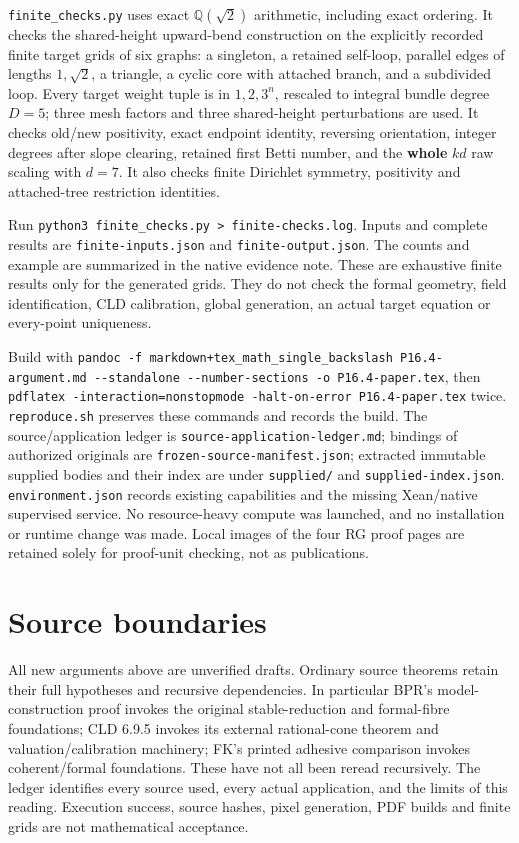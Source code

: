 \documentclass[
  11pt,
]{article}
\begin{document}
\texttt{finite\_checks.py} uses exact \(\mathbb Q(\sqrt2)\) arithmetic,
including exact ordering. It checks the shared-height upward-bend
construction on the explicitly recorded finite target grids of six
graphs: a singleton, a retained self-loop, parallel edges of lengths
\(1,\sqrt2\), a triangle, a cyclic core with attached branch, and a
subdivided loop. Every target weight tuple is in \({1,2,3}^n\), rescaled
to integral bundle degree \(D=5\); three mesh factors and three
shared-height perturbations are used. It checks old/new positivity,
exact endpoint identity, reversing orientation, integer degrees after
slope clearing, retained first Betti number, and the \textbf{whole}
\(kd\) raw scaling with \(d=7\). It also checks finite Dirichlet
symmetry, positivity and attached-tree restriction identities.

Run
\texttt{python3\ finite\_checks.py\ \textgreater{}\ finite-checks.log}.
Inputs and complete results are \texttt{finite-inputs.json} and
\texttt{finite-output.json}. The counts and example are summarized in
the native evidence note. These are exhaustive finite results only for
the generated grids. They do not check the formal geometry, field
identification, CLD calibration, global generation, an actual target
equation or every-point uniqueness.

Build with
\texttt{pandoc\ -f\ markdown+tex\_math\_single\_backslash\ P16.4-argument.md\ -\/-standalone\ -\/-number-sections\ -o\ P16.4-paper.tex},
then
\texttt{pdflatex\ -interaction=nonstopmode\ -halt-on-error\ P16.4-paper.tex}
twice. \texttt{reproduce.sh} preserves these commands and records the
build. The source/application ledger is
\texttt{source-application-ledger.md}; bindings of authorized originals
are \texttt{frozen-source-manifest.json}; extracted immutable supplied
bodies and their index are under \texttt{supplied/} and
\texttt{supplied-index.json}. \texttt{environment.json} records existing
capabilities and the missing Xean/native supervised service. No
resource-heavy compute was launched, and no installation or runtime
change was made. Local images of the four RG proof pages are retained
solely for proof-unit checking, not as publications.

\section{Source boundaries}\label{source-boundaries}

All new arguments above are unverified drafts. Ordinary source theorems
retain their full hypotheses and recursive dependencies. In particular
BPR's model-construction proof invokes the original stable-reduction and
formal-fibre foundations; CLD 6.9.5 invokes its external rational-cone
theorem and valuation/calibration machinery; FK's printed adhesive
comparison invokes coherent/formal foundations. These have not all been
reread recursively. The ledger identifies every source used, every
actual application, and the limits of this reading. Execution success,
source hashes, pixel generation, PDF builds and finite grids are not
mathematical acceptance.
\end{document}
